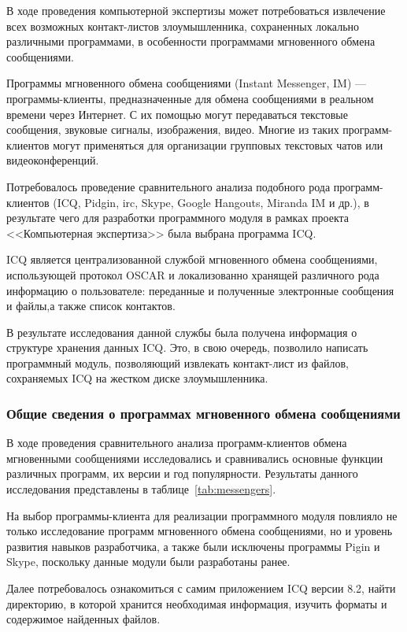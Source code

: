 
В ходе проведения компьютерной экспертизы может потребоваться извлечение всех 
возможных контакт-листов злоумышленника, сохраненных локально различными 
программами, в особенности программами мгновенного обмена сообщениями. 


Программы мгновенного обмена сообщениями (Instant Messenger, IM) --- программы-клиенты, предназначенные   для обмена сообщениями в реальном времени через Интернет. С их помощью могут передаваться текстовые сообщения, звуковые сигналы, изображения, видео. Многие из таких программ-клиентов могут применяться для организации групповых текстовых чатов или видеоконференций.


Потребовалось проведение сравнительного анализа подобного рода программ-клиентов 
(ICQ, Pidgin, irc, Skype, Google Hangouts, Miranda IM и др.), 
в результате чего для разработки программного модуля в рамках проекта
<<Компьютерная экспертиза>> была выбрана программа ICQ. 


ICQ является централизованной службой мгновенного обмена сообщениями, использующей протокол OSCAR
и локализованно хранящей различного рода информацию о пользователе: переданные и полученные 
электронные сообщения и файлы,а также список контактов.


В результате исследования данной службы была получена информация о структуре хранения данных ICQ. Это, в свою очередь, позволило написать программный модуль, позволяющий извлекать 
контакт-лист из файлов, сохраняемых ICQ на жестком диске злоумышленника. 

\subsubsection{Общие сведения о программах мгновенного обмена сообщениями}

В ходе проведения сравнительного анализа программ-клиентов обмена мгновенными сообщениями
исследовались и сравнивались основные функции различных программ, их версии и год популярности.
Результаты данного исследования представлены в таблице~\ref{tab:messengers}.



На выбор  программы-клиента для реализации программного модуля повлияло не только исследование программ мгновенного обмена сообщениями, но и уровень развития навыков разработчика, а также были исключены программы Pigin и Skype, поскольку данные модули были разработаны ранее. 


Далее потребовалось ознакомиться с самим приложением ICQ версии 8.2, найти директорию, в которой хранится необходимая информация, изучить форматы и содержимое найденных файлов. 


